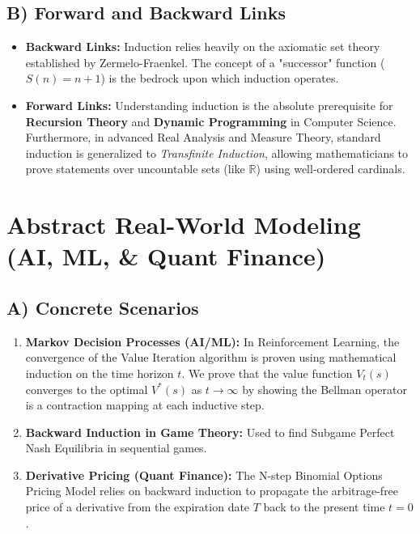 \documentclass[11pt, a4paper]{article}
\theoremstyle{definition}
\theoremstyle{remark}
\newcommand{\R}{\mathbb{R}}
\begin{document}
\subsection{B) Forward and Backward Links}
\begin{itemize}
    \item \textbf{Backward Links:} Induction relies heavily on the axiomatic set theory established by Zermelo-Fraenkel. The concept of a "successor" function ($S(n) = n+1$) is the bedrock upon which induction operates.
    \item \textbf{Forward Links:} Understanding induction is the absolute prerequisite for \textbf{Recursion Theory} and \textbf{Dynamic Programming} in Computer Science. Furthermore, in advanced Real Analysis and Measure Theory, standard induction is generalized to \textit{Transfinite Induction}, allowing mathematicians to prove statements over uncountable sets (like $\R$) using well-ordered cardinals.
\end{itemize}

\section{Abstract Real-World Modeling (AI, ML, \& Quant Finance)}

\subsection{A) Concrete Scenarios}
\begin{enumerate}
    \item \textbf{Markov Decision Processes (AI/ML):} In Reinforcement Learning, the convergence of the Value Iteration algorithm is proven using mathematical induction on the time horizon $t$. We prove that the value function $V_t(s)$ converges to the optimal $V^*(s)$ as $t \to \infty$ by showing the Bellman operator is a contraction mapping at each inductive step.
    \item \textbf{Backward Induction in Game Theory:} Used to find Subgame Perfect Nash Equilibria in sequential games.
    \item \textbf{Derivative Pricing (Quant Finance):} The N-step Binomial Options Pricing Model relies on backward induction to propagate the arbitrage-free price of a derivative from the expiration date $T$ back to the present time $t=0$.
\end{enumerate}
\end{document}
